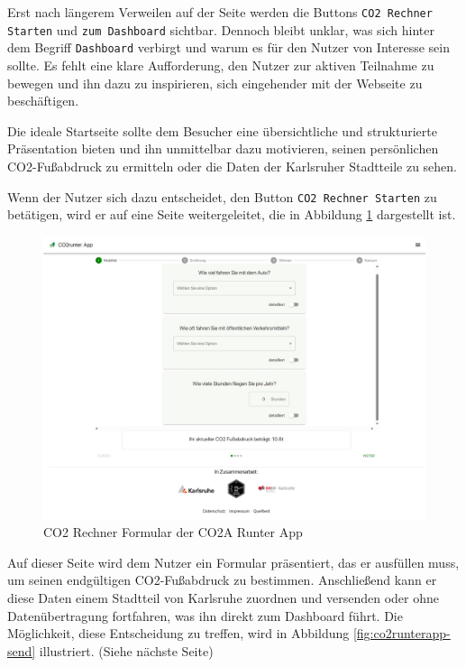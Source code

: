 Erst nach längerem Verweilen auf der Seite werden die Buttons \texttt{CO2 Rechner Starten} und \texttt{zum Dashboard} sichtbar. Dennoch bleibt unklar, was sich hinter dem Begriff \texttt{Dashboard} verbirgt und warum es für den Nutzer von Interesse sein sollte. Es fehlt eine klare Aufforderung, den Nutzer zur aktiven Teilnahme zu bewegen und ihn dazu zu inspirieren, sich eingehender mit der Webseite zu beschäftigen.

Die ideale Startseite sollte dem Besucher eine übersichtliche und strukturierte Präsentation bieten und ihn unmittelbar dazu motivieren, seinen persönlichen CO2-Fußabdruck zu ermitteln oder die Daten der Karlsruher Stadtteile zu sehen.

Wenn der Nutzer sich dazu entscheidet, den Button \texttt{CO2 Rechner Starten} zu betätigen, wird er auf eine Seite weitergeleitet, die in Abbildung \ref{fig:co2runterapp-rechner} dargestellt ist.

\begin{figure}[h]
    \centering
    \includegraphics[width=1\textwidth]{images/02/CO2-Runter-App-Rechner.jpeg}
    \caption{CO2 Rechner Formular der CO2A Runter App}
    \label{fig:co2runterapp-rechner}
\end{figure}

Auf dieser Seite wird dem Nutzer ein Formular präsentiert, das er ausfüllen muss, um seinen endgültigen CO2-Fußabdruck zu bestimmen. Anschließend kann er diese Daten einem Stadtteil von Karlsruhe zuordnen und versenden oder ohne Datenübertragung fortfahren, was ihn direkt zum Dashboard führt. Die Möglichkeit, diese Entscheidung zu treffen, wird in Abbildung \ref{fig:co2runterapp-send} illustriert. (Siehe nächste Seite)

